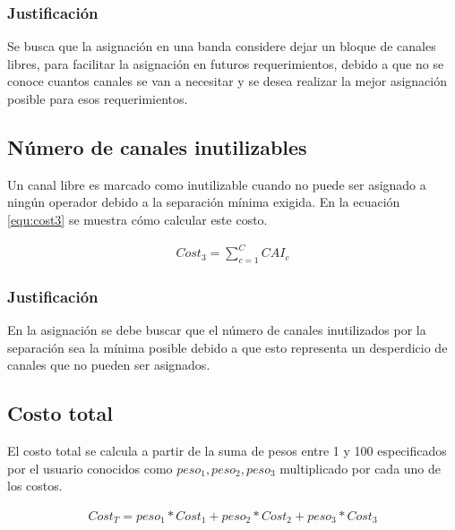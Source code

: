 \subsubsection{Justificación}

Se busca que la asignación en una banda considere dejar un bloque de canales libres, para facilitar la asignación en futuros requerimientos, debido a que no se conoce cuantos canales se van a necesitar y se desea realizar la mejor asignación posible para esos requerimientos.

\subsection{Número de canales inutilizables}

Un canal libre es marcado como inutilizable cuando no puede ser asignado a ningún operador debido a la separación mínima exigida. En la ecuación \ref{equ:cost3} se muestra cómo calcular este costo.

\begin{equation}
	\label{equ:cost3}
	\begin{array}{cc}
			Cost_{3} = \sum \limits^{C}_{c=1} CAI_{c}
	\end{array}
\end{equation}

\subsubsection{Justificación}

En la asignación se debe buscar que el número de canales inutilizados por la separación sea la mínima posible debido a que esto representa un desperdicio de canales que no pueden ser asignados.

\subsection{Costo total}

El costo total se calcula a partir de la suma de pesos entre 1 y 100 especificados por el usuario conocidos como $peso_{1}, peso_{2}, peso_{3}$ multiplicado por cada uno de los costos.

\begin{equation}
	\label{equ:costR}
	\begin{array}{cc}
		Cost_{T} = peso_{1}*Cost_{1} + peso_{2}*Cost_{2} + peso_{3}*Cost_{3}
	\end{array}
\end{equation}
